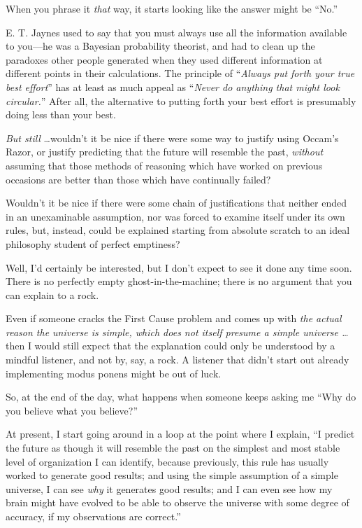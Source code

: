 {
 When you phrase it \textit{that} way, it starts looking like the
answer might be ``No.''}

{
 E. T. Jaynes used to say that you must always use all the
information available to you---he was a Bayesian probability theorist,
and had to clean up the paradoxes other people generated when they used
different information at different points in their calculations. The
principle of ``\textit{Always put forth your true best
effort}'' has at least as much appeal as
``\textit{Never do anything that might look
circular.}'' After all, the alternative to putting
forth your best effort is presumably doing less than your best.}

{
 \textit{But still} \ldots wouldn't it be nice if
there were some way to justify using Occam's Razor, or
justify predicting that the future will resemble the past,
\textit{without} assuming that those methods of reasoning which have
worked on previous occasions are better than those which have
continually failed?}

{
 Wouldn't it be nice if there were some chain of
justifications that neither ended in an unexaminable assumption, nor
was forced to examine itself under its own rules, but, instead, could
be explained starting from absolute scratch to an ideal philosophy
student of perfect emptiness?}

{
 Well, I'd certainly be interested, but I
don't expect to see it done any time soon. There is no
perfectly empty ghost-in-the-machine; there is no argument that you can
explain to a rock.}

{
 Even if someone cracks the First Cause problem and comes up with
\textit{the actual reason the universe is simple, which does not itself
presume a simple universe \ldots} then I would still expect that the
explanation could only be understood by a mindful listener, and not by,
say, a rock. A listener that didn't start out already
implementing modus ponens might be out of luck.}

{
 So, at the end of the day, what happens when someone keeps asking
me ``Why do you believe what you
believe?''}

{
 At present, I start going around in a loop at the point where I
explain, ``I predict the future as though it will
resemble the past on the simplest and most stable level of organization
I can identify, because previously, this rule has usually worked to
generate good results; and using the simple assumption of a simple
universe, I can see \textit{why} it generates good results; and I can
even see how my brain might have evolved to be able to observe the
universe with some degree of accuracy, if my observations are
correct.''}

